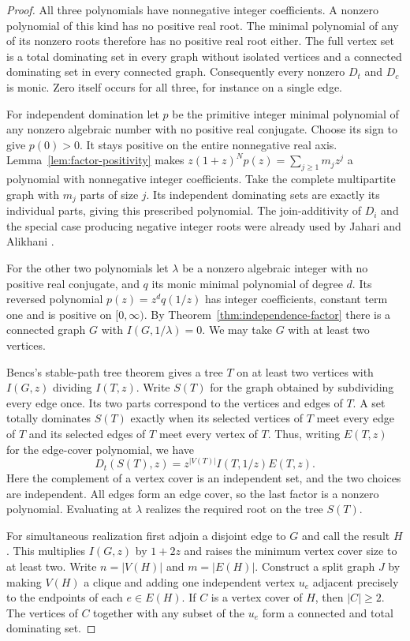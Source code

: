 \documentclass[11pt,a4paper]{article}
\begin{document}
\begin{proof}
All three polynomials have nonnegative integer coefficients. A nonzero
polynomial of this kind has no positive real root. The minimal polynomial
of any of its nonzero roots therefore has no positive real root either.
The full vertex set is a total dominating set in every graph without
isolated vertices and a connected dominating set in every connected graph.
Consequently every nonzero $D_t$ and $D_c$ is monic. Zero itself occurs
for all three, for instance on a single edge.

For independent domination let $p$ be the primitive integer minimal
polynomial of any nonzero algebraic number with no positive real conjugate.
Choose its sign to give $p(0)>0$. It stays positive on the entire
nonnegative real axis. Lemma~\ref{lem:factor-positivity} makes
$z(1+z)^Np(z)=\sum_{j\ge1}m_jz^j$ a polynomial with nonnegative
integer coefficients. Take the complete multipartite graph with $m_j$
parts of size $j$. Its independent dominating sets are exactly its
individual parts, giving this prescribed polynomial. The join-additivity
of $D_i$ and the special case producing negative integer roots were
already used by Jahari and Alikhani \cite{jahari}.

For the other two polynomials let $\lambda$ be a nonzero algebraic
integer with no positive real conjugate, and $q$ its monic minimal
polynomial of degree $d$. Its reversed polynomial
$p(z)=z^dq(1/z)$ has integer coefficients, constant term one and is
positive on $[0,\infty)$. By Theorem~\ref{thm:independence-factor}
there is a connected graph $G$ with $I(G,1/\lambda)=0$. We may
take $G$ with at least two vertices.

Bencs's stable-path tree theorem \cite{bencs} gives a tree $T$ on at
least two vertices with $I(G,z)$ dividing $I(T,z)$. Write $S(T)$ for
the graph obtained by subdividing every edge once. Its two parts correspond
to the vertices and edges of $T$. A set totally dominates $S(T)$ exactly
when its selected vertices of $T$ meet every edge of $T$ and its selected
edges of $T$ meet every vertex of $T$. Thus, writing $E(T,z)$ for the
edge-cover polynomial, we have
\[
 D_t(S(T),z)=z^{|V(T)|}I(T,1/z)E(T,z).
\]
Here the complement of a vertex cover is an independent set, and the
two choices are independent. All edges form an edge cover, so the last
factor is a nonzero polynomial. Evaluating at $\lambda$ realizes the
required root on the tree $S(T)$.

For simultaneous realization first adjoin a disjoint edge to $G$ and
call the result $H$. This multiplies $I(G,z)$ by $1+2z$ and raises the
minimum vertex cover size to at least two. Write $n=|V(H)|$ and
$m=|E(H)|$. Construct a split graph $J$ by making $V(H)$ a clique and
adding one independent vertex $u_e$ adjacent precisely to the endpoints
of each $e\in E(H)$. If $C$ is a vertex cover of $H$, then $|C|\ge2$.
The vertices of $C$ together with any subset of the $u_e$ form a
connected and total dominating set.


\end{proof}
\end{document}
